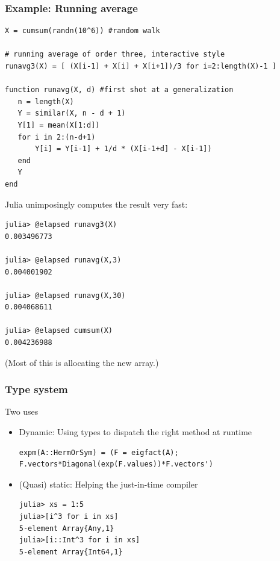 \documentclass{beamer}
\begin{document}
\begin{frame}[fragile]\frametitle{Example: Running average}
 
\begin{verbatim}
X = cumsum(randn(10^6)) #random walk

# running average of order three, interactive style
runavg3(X) = [ (X[i-1] + X[i] + X[i+1])/3 for i=2:length(X)-1 ]

function runavg(X, d) #first shot at a generalization
   n = length(X)
   Y = similar(X, n - d + 1)
   Y[1] = mean(X[1:d])
   for i in 2:(n-d+1)
       Y[i] = Y[i-1] + 1/d * (X[i-1+d] - X[i-1])
   end
   Y
end
\end{verbatim}
 
\end{frame}

\begin{frame}[fragile]
Julia unimposingly computes the result very fast:

 
\begin{verbatim}
julia> @elapsed runavg3(X)
0.003496773

julia> @elapsed runavg(X,3)
0.004001902

julia> @elapsed runavg(X,30)
0.004068611

julia> @elapsed cumsum(X)
0.004236988
\end{verbatim}
 
(Most of this is allocating the new array.)

\end{frame}

\begin{frame}[fragile]\frametitle{Type system}
Two uses

\begin{itemize}
\item Dynamic: Using types to dispatch the right method at runtime\\
\begin{verbatim}
expm(A::HermOrSym) = (F = eigfact(A); F.vectors*Diagonal(exp(F.values))*F.vectors')
\end{verbatim}
\item  (Quasi) static: Helping the just-in-time compiler\\
\begin{verbatim}
julia> xs = 1:5
julia>[i^3 for i in xs]
5-element Array{Any,1}
julia>[i::Int^3 for i in xs]
5-element Array{Int64,1}
\end{verbatim}

\end{itemize}


\end{frame}
 
\end{document}
